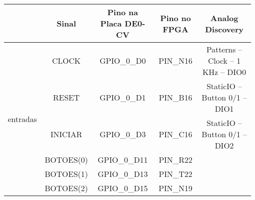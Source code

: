 \documentclass[amsmath,amssymb,floatfix]{report}
\begin{document}
\begin{table}[H]
\centering
\scriptsize
\begin{tabular}{c|c|c|c|c|}
\cline{2-5}
\multicolumn{1}{l|}{\textbf{}}                   & Sinal                   & Pino na Placa DE0-CV & Pino no FPGA                                                                                                                                                                          & Analog Discovery               \\ \hline
\multicolumn{1}{|c|}{\multirow{15}{*}{entradas}} & CLOCK                   & GPIO\_0\_D0          & PIN\_N16                                                                                                                                                                              & Patterns – Clock – 1 KHz – DIO0 \\ \cline{2-5} 
\multicolumn{1}{|c|}{}                           & RESET                   & GPIO\_0\_D1          & PIN\_B16                                                                                                                                                                              & StaticIO – Button 0/1 – DIO1          \\ \cline{2-5} 
\multicolumn{1}{|c|}{}                           & INICIAR                 & GPIO\_0\_D3          & PIN\_C16                                                                                                                                                                              & StaticIO – Button 0/1 – DIO2          \\ \cline{2-5} 
\multicolumn{1}{|c|}{}                           & BOTOES(0)               & GPIO\_0\_D11         & PIN\_R22                                                                                                                                                                              & \multicolumn{1}{l|}{}          \\ \cline{2-5} 
\multicolumn{1}{|c|}{}                           & BOTOES(1)               & GPIO\_0\_D13         & PIN\_T22                                                                                                                                                                              & \multicolumn{1}{l|}{}          \\ \cline{2-5} 
\multicolumn{1}{|c|}{}                           & BOTOES(2)               & GPIO\_0\_D15         & PIN\_N19                                                                                                                                                                              & \multicolumn{1}{l|}{}          \\ \cline{2-5} 

\end{tabular}
\end{table}
\end{document}
